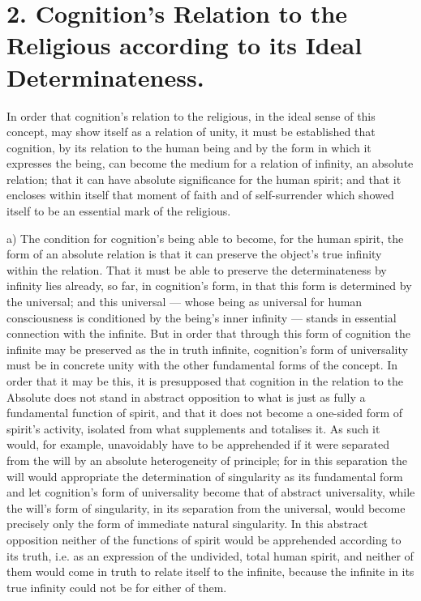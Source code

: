 \documentclass[12pt,a4paper]{book}
\begin{document}
\section*{2. Cognition's Relation to the Religious according to its Ideal Determinateness.}

In order that cognition's relation to the religious, in the ideal sense of
this concept, may show itself as a relation of unity, it must be established
that cognition, by its relation to the human being and by the form in which it
expresses the being, can become the medium for a relation of infinity, an
absolute relation; that it can have absolute significance for the human
spirit; and that it encloses within itself that moment of faith and
of self-surrender which showed itself to be an essential mark of the
religious.

a) The condition for cognition's being able to become, for the human spirit,
the form of an absolute relation is that it can preserve the object's true
infinity within the relation. That it must be able to preserve the
determinateness by infinity lies already, so far, in cognition's form, in that
this form is determined by the universal; and this universal --- whose being
as universal for human consciousness is conditioned by the being's inner
infinity --- stands in essential connection with the infinite. But in order
that through this form of cognition the infinite may be preserved as the in
truth infinite, cognition's form of universality must be in concrete unity
with the other fundamental forms of the concept. In order that it may be this,
it is presupposed that cognition in the relation to the Absolute does not
stand in abstract opposition to what is just as fully a fundamental function
of spirit, and that it does not become a one-sided form of spirit's activity,
isolated from what supplements and totalises it. As such it would, for
example, unavoidably have to be apprehended if it were separated from the will
by an absolute heterogeneity of principle; for in this separation the will
would appropriate the determination of singularity as its fundamental form and
let cognition's form of universality become that of abstract universality,
while the will's form of singularity, in its separation from the universal,
would become precisely only the form of immediate natural singularity. In this
abstract opposition neither of the functions of spirit would be apprehended
according to its truth, i.e. as an expression of the undivided, total human
spirit, and neither of them would come in truth to relate itself to the
infinite, because the infinite in its true infinity could not be for either of
them.
\end{document}

